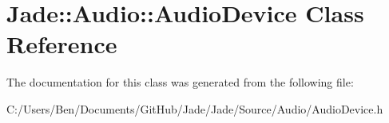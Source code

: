 \hypertarget{class_jade_1_1_audio_1_1_audio_device}{}\section{Jade\+:\+:Audio\+:\+:Audio\+Device Class Reference}
\label{class_jade_1_1_audio_1_1_audio_device}


The documentation for this class was generated from the following file\+:\begin{DoxyCompactItemize}
\item 
C\+:/\+Users/\+Ben/\+Documents/\+Git\+Hub/\+Jade/\+Jade/\+Source/\+Audio/Audio\+Device.\+h\end{DoxyCompactItemize}
